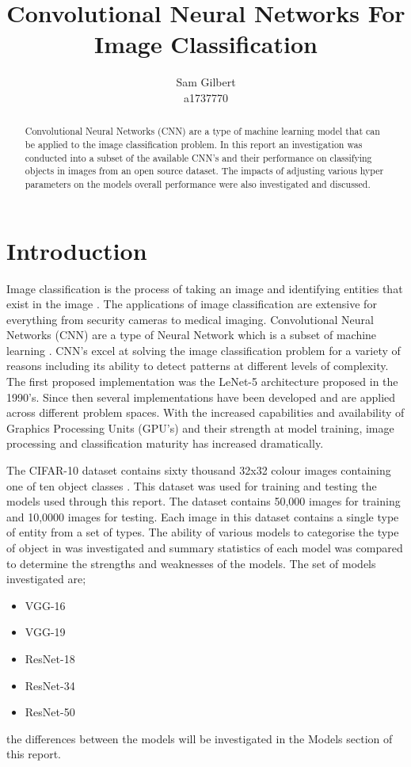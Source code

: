 \documentclass[10pt,twocolumn,letterpaper]{article}
\begin{document}
\title{Convolutional Neural Networks For Image Classification}

\author{Sam Gilbert\\
   a1737770\\}
\maketitle

\begin{abstract}
Convolutional Neural Networks (CNN) are a type of machine learning model that can be 
applied to the image classification problem. In this report an investigation was 
conducted into a subset of the available CNN's and their performance on classifying 
objects in images from an open source dataset. The impacts of adjusting various hyper
parameters on the models overall performance were also investigated and discussed.
\end{abstract}

\section{Introduction}
Image classification is the process of taking an image and identifying entities that exist in 
the image \cite{fang_computer_2020}. The applications of image classification are extensive for everything 
from security cameras to medical imaging. Convolutional Neural Networks (CNN) are a type of Neural Network
which is a subset of machine learning \cite{ibmWhatConvolutional}. CNN's excel at solving 
the image classification problem for a variety of reasons including 
its ability to detect patterns at different levels of complexity. The first proposed implementation
was the LeNet-5 architecture proposed in the 1990's. Since then several implementations 
have been developed and are applied across different problem spaces. With the increased 
capabilities and availability of Graphics Processing Units (GPU's) and their strength at model training, image 
processing and classification maturity has increased dramatically.

The CIFAR-10 dataset contains sixty thousand 32x32 colour images containing one of ten 
object classes \cite{cifar-10}. This dataset was used for training and testing the models 
used through this report. The dataset contains 50,000 images for training and 10,0000
images for testing. Each image in this dataset contains a single type of entity from 
a set of types. The ability of various models to categorise the type of object in was 
investigated and summary statistics of each model was compared to determine the strengths 
and weaknesses of the models. The set of models investigated are;
\begin{itemize}
   \item VGG-16 
   \item VGG-19 
   \item ResNet-18 
   \item ResNet-34 
   \item ResNet-50 
 \end{itemize}
the differences between the models will be investigated in the Models section of this report.
\end{document}
